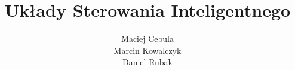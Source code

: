 \documentclass[12pt]{report}
\title{\textbf{Układy Sterowania Inteligentnego}}
\author{Maciej Cebula \\Marcin Kowalczyk \\ Daniel Rubak}
\date{}
\begin{document}
	

	\setcounter{tocdepth}{2}
	
	\maketitle
	\tableofcontents
	\clearpage
		
		\renewcommand{\tablename}{Tabela}
		\renewcommand{\figurename}{Rys.}
		
	
	
	
	
	
	
	
	
	
	
\end{document}
